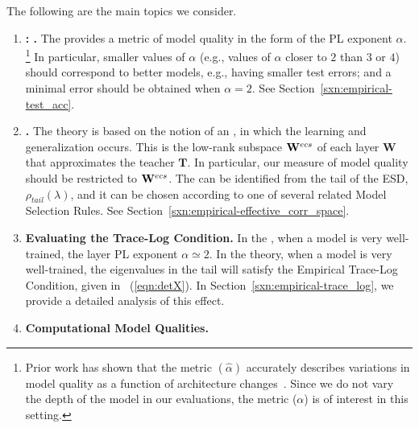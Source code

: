The following are the main topics we consider.

\begin{enumerate}[label=6.\arabic*]
\item
\textbf{\ModelQuality: \HTSR \Phenomenology.}
The \HTSR \Phenomenology provides a metric of model quality in the form of the PL exponent $\alpha$.%
\footnote{Prior work has shown that the \ALPHAHAT metric $(\hat{\alpha})$ accurately describes variations in model 
quality as a function of architecture changes~\cite{MM21a_simpsons_TR}. Since we do not vary the depth of the model in 
our evaluations, the \ALPHA metric ($\alpha$) is of interest in this setting.} 
In particular, smaller values of $\alpha$ (e.g., 
values of $\alpha$ closer to $2$ than $3$ or $4$) should correspond to better models, e.g., having smaller test errors; and
a minimal error should be obtained when $\alpha=2$.
See Section~\ref{sxn:empirical-test_acc}.
\item 
\textbf{\EffectiveCorrelationSpace.}
The \SETOL theory is based on the notion of an \EffectiveCorrelationSpace, in which the learning and generalization occurs. 
This is the low-rank subspace $\mathbf{W}^{ecs}$ of each layer $\mathbf{W}$ that approximates the teacher $\mathbf{T}$.
In particular, 
our measure of model quality should be restricted to $\mathbf{W}^{ecs}$.
The \EffectiveCorrelationSpace can be identified from the tail of the ESD, $\rho_{tail}(\lambda)$, and it can be chosen according to one of several related Model Selection Rules.
See Section~\ref{sxn:empirical-effective_corr_space}.
\item 
\textbf{Evaluating the Trace-Log Condition.}
In the \HTSR \Phenomenology, when a model is very well-trained, the layer PL exponent $\alpha\simeq 2$.
In the \SETOL theory, when a model is very well-trained, the eigenvalues in the tail will satisfy the Empirical Trace-Log Condition, given in \EQN~(\ref{eqn:detX}).
In Section~\ref{sxn:empirical-trace_log}, we provide a detailed analysis of this effect.
\item
\textbf{Computational Model Qualities.}

\end{enumerate}
